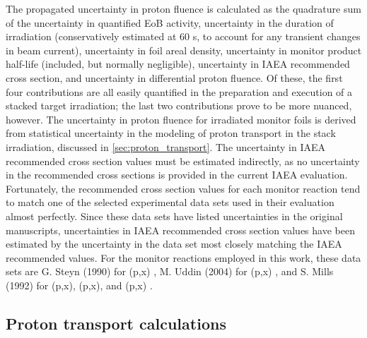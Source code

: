 \documentclass[3p]{elsarticle}
\begin{document}
The propagated uncertainty in proton fluence is calculated as the quadrature sum of the uncertainty in quantified EoB activity, uncertainty in the duration of irradiation (conservatively estimated at 60 s, to account for any transient changes in beam current), uncertainty in foil areal density, uncertainty in monitor product half-life (included, but normally negligible), uncertainty in IAEA recommended cross section, and uncertainty in differential proton fluence.
Of these, the first four contributions are all easily quantified in the preparation and execution of a stacked target irradiation;  the last two contributions prove to be more nuanced, however.
The uncertainty in proton fluence for irradiated monitor foils is derived from statistical uncertainty in the modeling of proton transport in the stack irradiation, discussed in \autoref{sec:proton_transport}.
The uncertainty in IAEA recommended cross section values must be estimated indirectly, as no uncertainty in the  recommended cross sections is provided in the current IAEA evaluation.
Fortunately, the recommended cross section values for each monitor reaction tend to match one of the   selected experimental data sets used in their evaluation almost perfectly.
Since these data sets have listed uncertainties in the original manuscripts, uncertainties in  IAEA recommended cross section values have been estimated by the uncertainty in the data set most closely matching the  IAEA recommended  values.
For the monitor reactions employed in this work, these data sets are G. Steyn (1990) for  (p,x) \cite{Steyn1990}, M. Uddin (2004) for (p,x) \cite{Uddin2004}, and S. Mills (1992) for (p,x), (p,x), and (p,x) \cite{Mills1992}.




\subsection{Proton transport calculations}\label{sec:proton_transport}
\end{document}
